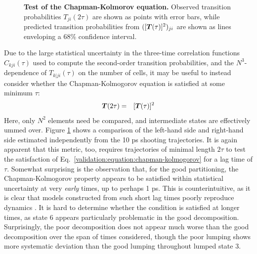 \begin{figure}[tbp]
  \begin{center}
  \end{center}
  \caption{
  {\bf Test of the Chapman-Kolmorov equation.}  
  Observed transition probabilities $T_{ji}(2\tau)$ are shown as points with error bars, while predicted transition probabilities from $([{\mbox{\boldmath{$T$}}}(\tau)]^2)_{ji}$ are shown as lines enveloping a 68\% confidence interval.
  }
  \label{validation:figure:chapman-kolmogorov}
\end{figure}

Due to the large statistical uncertainty in the three-time correlation functions $C_{kji}(\tau)$ used to compute the second-order transition probabilities, and the $N^3$-dependence of $T_{k|ji}(\tau)$ on the number of cells, it may be useful to instead consider whether the Chapman-Kolmogorov equation is satisfied at some minimum $\tau$:
\begin{eqnarray}
{\mbox{\boldmath{$T$}}}(2\tau) &=& [{\mbox{\boldmath{$T$}}}(\tau)]^2 \label{validation:equation:chapman-kolmogorov}
\end{eqnarray}
Here, only $N^2$ elements need be compared, and intermediate states are effectively ummed over.
Figure \ref{validation:figure:chapman-kolmogorov} shows a comparison of the left-hand side and right-hand side estimated independently from the 10 ps shooting trajectories.
It is again apparent that this metric, too, requires trajectories of minimal length $2\tau$ to test the satisfaction of Eq.\ \ref{validation:equation:chapman-kolmogorov} for a lag time of $\tau$.
Somewhat surprising is the observation that, for the good partitioning, the Chapman-Kolmogorov property appears to be satisfied within statistical uncertainty at very \emph{early} times, up to perhaps 1 ps.
This is counterintuitive, as it is clear that models constructed from such short lag times poorly reproduce dynamics \cite{chodera:mms:2006}.
It is hard to determine whether the condition is satisfied at longer times, as state 6 appears particularly problematic in the good decomposition.
Surprisingly, the poor decomposition does not appear much worse than the good decomposition over the span of times considered, though the poor lumping shows more systematic deviation than the good lumping throughout lumped state 3.

